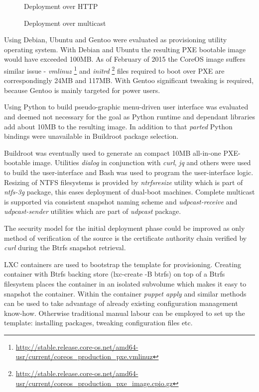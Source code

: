 \documentclass{article}
\begin{document}
\begin{figure}[!htb]
\centering
\scalebox{0.5}{}
\caption{Deployment over HTTP}
\label{fig:butterknife-usercase-http}
\end{figure}


\begin{figure}[!htb]
\centering
\scalebox{0.5}{}
\caption{Deployment over multicast}
\label{fig:butterknife-usecase-multicast}
\end{figure}


Using Debian, Ubuntu and Gentoo were evaluated as provisioning utility
operating system. With Debian and Ubuntu the resulting PXE bootable image
would have exceeded 100MB.
As of February of 2015 the CoreOS image suffers similar issue -
\emph{vmlinuz}
\footnote{\url{http://stable.release.core-os.net/amd64-usr/current/coreos_production_pxe.vmlinuz}}
and
\emph{initrd}
\footnote{\url{http://stable.release.core-os.net/amd64-usr/current/coreos_production_pxe_image.cpio.gz}}
files required to boot over PXE are correspondingly 24MB and 117MB.
With Gentoo significant tweaking is required, because Gentoo is
mainly targeted for power users.

Using Python to build pseudo-graphic menu-driven user interface was
evaluated and deemed not necessary for the goal as Python runtime and
dependant libraries add about 10MB to the resulting image.
In addition to that \emph{parted} Python bindings were unavailable
in Buildroot package selection.

Buildroot was eventually used to generate an compact 10MB all-in-one
PXE-bootable image. Utilities \emph{dialog} in conjunction with
\emph{curl}, \emph{jq} and others were used to build the user-interface
and Bash was used to program the user-interface logic.
Resizing of NTFS filesystems is provided by \emph{ntrfsresize} utility
which is part of \emph{ntfs-3g} package, this eases deployment of
dual-boot machines.
Complete multicast is supported via consistent snapshot naming scheme
and \emph{udpcast-receive} and \emph{udpcast-sender} utilities which
are part of \emph{udpcast} package.

The security model for the initial deployment phase could be improved
as only method of verification of the source is the certificate
authority chain verified by \emph{curl} during the Btrfs snapshot
retrieval.

LXC containers are used to bootstrap the template for provisioning.
Creating container with Btrfs backing store (lxc-create -B btrfs)
on top of a Btrfs filesystem places the container in an
isolated subvolume which makes it easy to snapshot the container.
Within the container \emph{puppet apply} and similar methods can be used
to take advantage of already existing configuration management know-how.
Otherwise traditional manual labour can be employed to set up the template: installing packages, tweaking configuration files etc.
\end{document}
